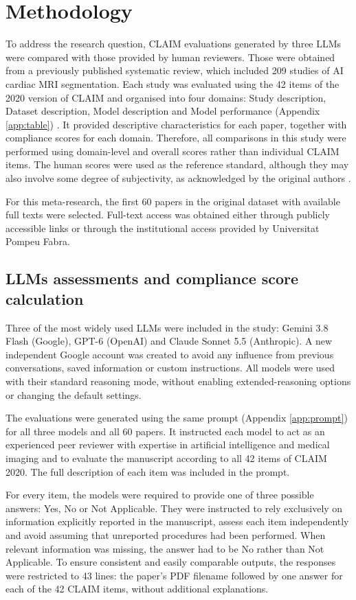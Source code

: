 \section{Methodology}
To address the research question, CLAIM evaluations generated by three LLMs were compared with those provided by human reviewers. Those were obtained from a previously published systematic review, which included 209 studies of AI cardiac MRI segmentation. Each study was evaluated using the 42 items of the 2020 version of CLAIM and organised into four domains: Study description, Dataset description, Model description and Model performance (Appendix \ref{app:table}) \cite{alabed2022quality}. It provided descriptive characteristics for each paper, together with compliance scores for each domain. Therefore, all comparisons in this study were performed using domain-level and overall scores rather than individual CLAIM items. The human scores were used as the reference standard, although they may also involve some degree of subjectivity, as acknowledged by the original authors \cite{alabed2022quality}. 

For this meta-research, the first 60 papers in the original dataset with available full texts were selected. Full-text access was obtained either through publicly accessible links or through the institutional access provided by Universitat Pompeu Fabra. 

\subsection{LLMs assessments and compliance score calculation}
Three of the most widely used LLMs were included in the study: Gemini 3.8 Flash (Google), GPT-6 (OpenAI) and Claude Sonnet 5.5 (Anthropic). A new independent Google account was created to avoid any influence from previous conversations, saved information or custom instructions. All models were used with their standard reasoning mode, without enabling extended-reasoning options or changing the default settings. 

The evaluations were generated using the same prompt (Appendix \ref{app:prompt}) for all three models and all 60 papers. It instructed each model to act as an experienced peer reviewer with expertise in artificial intelligence and medical imaging and to evaluate the manuscript according to all 42 items of CLAIM 2020. The full description of each item was included in the prompt. 

For every item, the models were required to provide one of three possible answers: Yes, No or Not Applicable. They were instructed to rely exclusively on information explicitly reported in the manuscript, assess each item independently and avoid assuming that unreported procedures had been performed. When relevant information was missing, the answer had to be No rather than Not Applicable. To ensure consistent and easily comparable outputs, the responses were restricted to 43 lines: the paper’s PDF filename followed by one answer for each of the 42 CLAIM items, without additional explanations.

